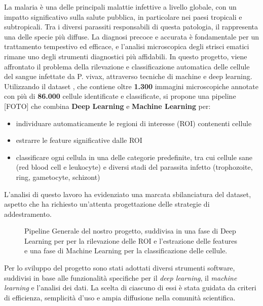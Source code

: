 \documentclass[minted, draw]{../tex/hebdomon}
\begin{document}
La malaria è una delle principali malattie infettive a livello globale, con un impatto significativo sulla salute pubblica, in particolare nei paesi tropicali e subtropicali. Tra i diversi parassiti responsabili di questa patologia, il  rappresenta una delle specie più diffuse. La diagnosi precoce e accurata è fondamentale per un trattamento tempestivo ed efficace, e l’analisi microscopica degli strisci ematici rimane uno degli strumenti diagnostici più affidabili.
In questo progetto, viene affrontato il problema della rilevazione e classificazione automatica delle cellule del sangue infettate da P. vivax, attraverso tecniche di machine e deep learning.
Utilizzando il dataset , che contiene oltre \textbf{1.300} immagini microscopiche annotate con più di \textbf{86.000} cellule identificate e classificate, si propone una pipeline [FOTO] che combina \textbf{Deep Learning} e \textbf{Machine Learning} per:

\begin{itemize}
	\item individuare automaticamente le regioni di interesse (ROI) contenenti cellule
	\item estrarre le feature significative dalle ROI
	\item classificare ogni cellula in una delle categorie predefinite, tra cui cellule sane (red blood cell e leukocyte) e diversi stadi del parassita infetto (trophozoite, ring, gametocyte, schizont)
\end{itemize}

\begin{warning}
	L’analisi di questo lavoro ha evidenziato una marcata sbilanciatura del dataset, aspetto che ha richiesto un’attenta progettazione delle strategie di addestramento.
\end{warning}
%
\begin{figure}[ht]
	\centering
	
	\caption{Pipeline Generale del nostro progetto, suddivisa in una fase di Deep Learning per per la rilevazione delle ROI e l'estrazione delle features e una fase di Machine Learning per la classificazione delle cellule.}
\end{figure}
%


Per lo sviluppo del progetto sono stati adottati diversi strumenti software, suddivisi in base alle funzionalità specifiche per il \textit{deep learning}, il \textit{machine learning} e l’analisi dei dati. La scelta di ciascuno di essi è stata guidata da criteri di efficienza, semplicità d’uso e ampia diffusione nella comunità scientifica.
\end{document}
